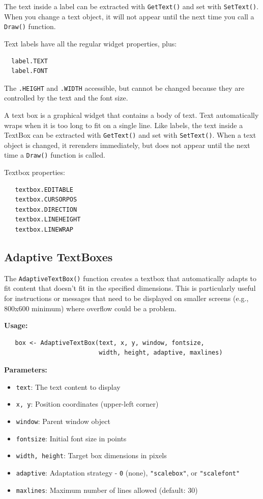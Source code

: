 The text inside a label can be extracted with \texttt{GetText()} 
and set with \texttt{SetText()}. When you change a text object, 
it will not appear until the next time you call a \texttt{Draw()} function.

Text labels have all the regular widget properties, plus:
\begin{verbatim}
  label.TEXT 
  label.FONT
\end{verbatim}
  


The \verb+.HEIGHT+ and \verb+.WIDTH+ accessible, but cannot be changed
because they are controlled by the text and the font size.



A text box is a graphical widget that contains a body of text.  Text
automatically wraps when it is too long to fit on a single line.  Like
labels, the text inside a TextBox can be extracted with
\texttt{GetText()} and set with \texttt{SetText()}. When a text object
is changed, it rerenders immediately, but does not appear until the
next time a \texttt{Draw()} function is called.


Textbox properties:
\begin{verbatim}
   textbox.EDITABLE
   textbox.CURSORPOS 
   textbox.DIRECTION
   textbox.LINEHEIGHT
   textbox.LINEWRAP
\end{verbatim}
 

\subsection{Adaptive TextBoxes}

The \texttt{AdaptiveTextBox()} function creates a textbox that automatically adapts to fit content that doesn't fit in the specified dimensions. This is particularly useful for instructions or messages that need to be displayed on smaller screens (e.g., 800x600 minimum) where overflow could be a problem.

\textbf{Usage:}
\begin{verbatim}
   box <- AdaptiveTextBox(text, x, y, window, fontsize, 
                          width, height, adaptive, maxlines)
\end{verbatim}

\textbf{Parameters:}
\begin{itemize}
\item \texttt{text}: The text content to display
\item \texttt{x, y}: Position coordinates (upper-left corner)
\item \texttt{window}: Parent window object
\item \texttt{fontsize}: Initial font size in points
\item \texttt{width, height}: Target box dimensions in pixels
\item \texttt{adaptive}: Adaptation strategy - \texttt{0} (none), \texttt{"scalebox"}, or \texttt{"scalefont"}
\item \texttt{maxlines}: Maximum number of lines allowed (default: 30)
\end{itemize}

